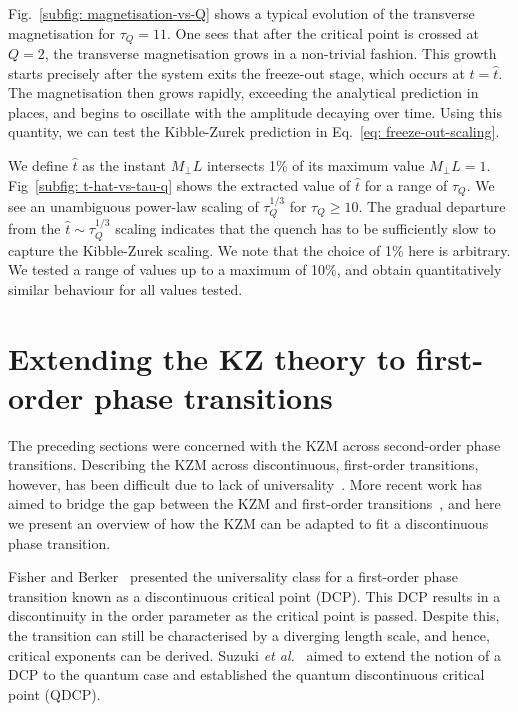 Fig.~\ref{subfig: magnetisation-vs-Q} shows a typical evolution of the
transverse magnetisation for \(\tau_Q = 11\).
One sees that after the critical point is crossed at \( Q = 2 \), the transverse
magnetisation grows in a non-trivial fashion.
This growth starts precisely after the system exits the freeze-out stage, which
occurs at \(t=\hat{t}\).
The magnetisation then grows rapidly, exceeding the analytical prediction in
places, and begins to oscillate with the amplitude decaying over time.
Using this quantity, we can test the Kibble-Zurek prediction in
Eq.~\eqref{eq: freeze-out-scaling}.

We define \( \hat{t} \) as the instant \(M_\perp L\) intersects 1\% of its
maximum value \(M_\perp L = 1\).
Fig~\ref{subfig: t-hat-vs-tau-q} shows the extracted value of \( \hat{t} \) for
a range of \( \tau_Q \).
We see an unambiguous power-law scaling of \(\tau_Q^{1/3}\) for
\(\tau_Q \geq 10\).
The gradual departure from the \(\hat{t} \sim \tau_Q^{1/3}\) scaling indicates
that the quench has to be sufficiently slow to capture the Kibble-Zurek scaling.
We note that the choice of 1\% here is arbitrary.
We tested a range of values up to a maximum of 10\%, and obtain quantitatively
similar behaviour for all values tested.

\section{Extending the KZ theory to first-order phase transitions}
The preceding sections were concerned with the KZM across second-order phase
transitions.
Describing the KZM across discontinuous, first-order transitions, however, has
been difficult due to lack of
universality~\cite{Turban2002,Continentino2004,Nauenberg1975}.
More recent work has aimed to bridge the gap between the KZM and first-order
transitions~\cite{Suzuki2015}, and here we present an overview of how the KZM
can be adapted to fit a discontinuous phase transition.

Fisher and Berker~\cite{Fisher1982} presented the universality class for
a first-order phase transition known as a discontinuous critical point (DCP).
This DCP results in a discontinuity in the order parameter as the critical point
is passed.
Despite this, the transition can still be characterised by a diverging length
scale, and hence, critical exponents can be derived.
Suzuki \textit{et al.}~\cite{Suzuki2015} aimed to extend the notion of a DCP to
the quantum case and established the quantum discontinuous critical point
(QDCP).

